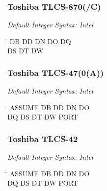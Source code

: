 \subsubsection{Toshiba TLCS-870(/C)}

{\em Default Integer Syntax: Intel}

{\tt\begin{tabbing}
\hspace{3cm}\=\hspace{3cm}\=\hspace{3cm}\=\hspace{3cm}\=\kill
DB         \> DD          \> DN         \> DO          \> DQ \\
DS         \> DT          \> DW \\
\end{tabbing}}

\subsubsection{Toshiba TLCS-47(0(A))}

{\em Default Integer Syntax: Intel}

{\tt\begin{tabbing}
\hspace{3cm}\=\hspace{3cm}\=\hspace{3cm}\=\hspace{3cm}\=\kill
ASSUME     \> DB          \> DD         \> DN          \> DO \\
DQ         \> DS          \> DT         \> DW          \> PORT \\
\end{tabbing}}

\subsubsection{Toshiba TLCS-42}

{\em Default Integer Syntax: Intel}

{\tt\begin{tabbing}
\hspace{3cm}\=\hspace{3cm}\=\hspace{3cm}\=\hspace{3cm}\=\kill
ASSUME     \> DB          \> DD         \> DN          \> DO \\
DQ         \> DS          \> DT         \> DW          \> PORT \\
\end{tabbing}}

